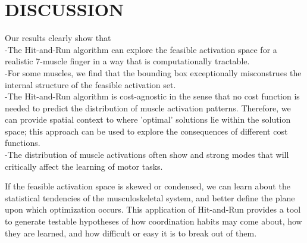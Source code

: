 \section{DISCUSSION}

Our results clearly show that\\
-The Hit-and-Run algorithm can explore the feasible activation space for a realistic 7-muscle finger in a way that is computationally tractable.\\
-For some muscles, we find that the bounding box exceptionally misconstrues the internal structure of the feasible activation set.\\
-The Hit-and-Run algorithm is cost-agnostic in the sense that no cost function is needed to predict the distribution of muscle activation patterns. Therefore, we can provide spatial context to where 'optimal' solutions lie within the solution space; this approach can be used to explore the consequences of different cost functions.\\
-The distribution of muscle activations often show and strong modes that will critically affect the learning of motor tasks.


If the feasible activation space is skewed or condensed, we can learn about the statistical tendencies of the musculoskeletal system, and better define the plane upon which optimization occurs. This application of Hit-and-Run provides a tool to generate testable hypotheses of how coordination habits may come about, how they are learned, and how difficult or easy it is to break out of them. 


